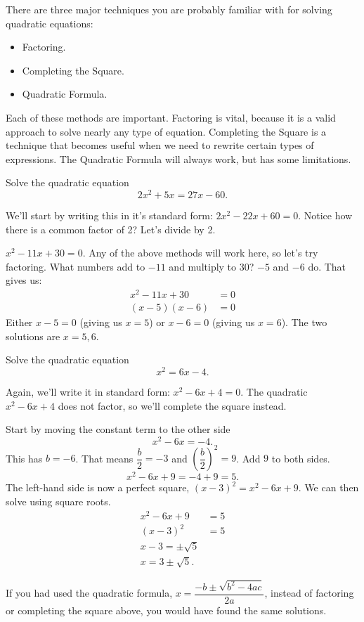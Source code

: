 \documentclass{ximera}
\begin{document}
There are three major techniques you are probably familiar with for solving quadratic equations:
\begin{itemize}
	\item Factoring.
	\item Completing the Square.
	\item Quadratic Formula.
\end{itemize}

Each of these methods are important.  Factoring is vital, because it is a valid approach to solve nearly any type of equation.  Completing
the Square is a technique that becomes useful when we need to rewrite certain types of expressions.  The Quadratic Formula will always
work, but has some limitations.

\begin{example}
	Solve the quadratic equation
	\[ 2x^2 +5x = 27 x - 60. \]
	\begin{explanation}
		We'll start by writing this in it's standard form: $2x^2 - 22x + 60 = 0$.  Notice how there is a common factor of 2? Let's divide by 2.
		
		$x^2 - 11x + 30 = 0$.  Any of the above methods will work here, so let's try factoring.  What numbers add to $-11$ and multiply to $30$?
		$-5$ and $-6$ do. That gives us:
		\begin{align*}
			x^2 - 11x + 30 &= 0\\
			(x-5)(x-6) &= 0
		\end{align*}
		Either $x-5 = 0$ (giving us $x=5$) or $x-6 = 0$ (giving us $x=6$).  The two solutions are $x = 5, 6$.
	\end{explanation}
\end{example}	

\begin{example}
	Solve the quadratic equation
	\[  x^2 = 6x -4.\]
	\begin{explanation}
		Again, we'll write it in standard form: $x^2 - 6x + 4 = 0$.  The quadratic $x^2 -6x+4$ does not factor, so we'll complete the square instead.
		
		Start by moving the constant term to the other side
		\[ x^2 - 6x = -4. \]
		This has $b = -6$.  That means $\displaystyle \dfrac{b}{2} = -3$ and $\displaystyle \left( \dfrac{b}{2}\right)^2 = 9$.  Add $9$ to both sides.
		\[ x^2 - 6x + 9 = -4 + 9 = 5. \]
		The left-hand side is now a perfect square, $\left(x-3\right)^2 = x^2 - 6x + 9$.  We can then solve using square roots.
		\begin{align*}
			x^2 - 6x + 9 &=  5\\
			\left( x-3 \right)^2 &= 5\\
			x-3 = \pm \sqrt{5} \\
			x = 3 \pm \sqrt{5}.
		\end{align*}
	\end{explanation}
\end{example}
If you had used the quadratic formula, $\displaystyle x = \dfrac{-b \pm \sqrt{b^2-4ac}}{2a}$, instead of factoring or completing the square above, you would have found the same solutions.
\end{document}
